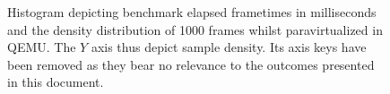 
\begin{figure}
	\centering
	

	\caption[Benchmark results - paravirtualized in QEMU]{Histogram depicting benchmark elapsed frametimes in milliseconds and the density distribution of 1000 frames whilst paravirtualized in QEMU. The $Y$ axis thus depict sample density. Its axis keys have been removed as they bear no relevance to the outcomes presented in this document.}
	\label{fig:histogramsqemu}
\end{figure}
